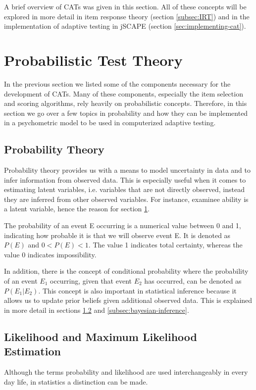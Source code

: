 A brief overview of CATs was given in this section. All of these concepts will be explored in more detail in item response theory (section \ref{subsec:IRT}) and in the implementation of adaptive testing in jSCAPE (section \ref{sec:implementing-cat}).

\section{Probabilistic Test Theory}
\label{sec:probabilistic-test-theory}
In the previous section we listed some of the components necessary for the development of CATs. Many of these components, especially the item selection and scoring algorithms, rely heavily on probabilistic concepts. Therefore, in this section we go over a few topics in probability and how they can be implemented in a psychometric model to be used in computerized adaptive testing.

\subsection{Probability Theory}
\label{subsec:probability-theory}
Probability theory provides us with a means to model uncertainty in data and to infer information from observed data. This is especially useful when it comes to estimating latent variables, i.e. variables that are not directly observed, instead they are inferred from other observed variables. For instance, examinee ability is a latent variable, hence the reason for section \ref{sec:probabilistic-test-theory}.
\newline

The probability of an event E occurring is a numerical value between 0 and 1, indicating how probable it is that we will observe event E. It is denoted as $P(E)$ and $0 < P(E) < 1$. The value 1 indicates total certainty, whereas the value 0 indicates impossibility. \newline

In addition, there is the concept of conditional probability where the probability of an event $E_1$ occurring, given that event $E_2$ has occurred, can be denoted as $P(E_1|E_2)$. This concept is also important in statistical inference because it allows us to update prior beliefs given additional observed data. This is explained in more detail in sections \ref{subsec:likelihood-and-mle} and \ref{subsec:bayesian-inference}.

\subsection{Likelihood and Maximum Likelihood Estimation}
\label{subsec:likelihood-and-mle}
Although the terms probability and likelihood are used interchangeably in every day life, in statistics a distinction can be made.\newline

